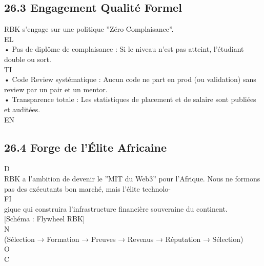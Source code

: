 \subsection{26.3 Engagement Qualité Formel}
RBK s’engage sur une politique ”Zéro Complaisance”.\\
\vspace{0.5em}
\vspace{0.5em}
\vspace{0.5em}
\vspace{0.5em}
EL\\
• Pas de diplôme de complaisance : Si le niveau n’est pas atteint, l’étudiant double ou sort.\\
\vspace{0.5em}
\vspace{0.5em}
\vspace{0.5em}
\vspace{0.5em}
TI\\
• Code Review systématique : Aucun code ne part en prod (ou validation) sans review par un pair et un mentor.\\
\vspace{0.5em}
• Transparence totale : Les statistiques de placement et de salaire sont publiées et auditées.\\
\vspace{0.5em}
\vspace{0.5em}
\vspace{0.5em}
\vspace{0.5em}
EN\\
\subsection{26.4 Forge de l’Élite Africaine}
\vspace{0.5em}
\vspace{0.5em}
\vspace{0.5em}
\vspace{0.5em}
D\\
RBK a l’ambition de devenir le ”MIT du Web3” pour l’Afrique. Nous ne formons pas des exécutants bon marché, mais l’élite technolo-\\
\vspace{0.5em}
\vspace{0.5em}
FI\\
gique qui construira l’infrastructure financière souveraine du continent.\\
\vspace{0.5em}
[Schéma : Flywheel RBK]\\
N\\
(Sélection → Formation → Preuves → Revenus → Réputation → Sélection)\\
O\\
C\\
\vspace{0.5em}
\vspace{0.5em}
